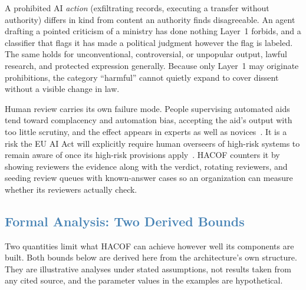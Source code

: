 \documentclass[journal]{IEEEtran}
\newcommand{\hacof}{HACOF}
\begin{document}
A prohibited AI \textit{action} (exfiltrating records, executing a transfer without authority) differs in kind from content an authority finds disagreeable. An agent drafting a pointed criticism of a ministry has done nothing Layer~1 forbids, and a classifier that flags it has made a political judgment however the flag is labeled. The same holds for unconventional, controversial, or unpopular output, lawful research, and protected expression generally. Because only Layer~1 may originate prohibitions, the category ``harmful'' cannot quietly expand to cover dissent without a visible change in law.

Human review carries its own failure mode. People supervising automated aids tend toward complacency and automation bias, accepting the aid's output with too little scrutiny, and the effect appears in experts as well as novices~\cite{parasuraman2010complacency}.
It is a risk the EU AI Act will explicitly require human overseers of high-risk systems to remain aware of once its high-risk provisions apply~\cite{euaiact2024}.
\hacof{} counters it by showing reviewers the evidence along with the verdict, rotating reviewers, and seeding review queues with known-answer cases so an organization can measure whether its reviewers actually check.

\subsection{\textcolor{steelblue}{Formal Analysis: Two Derived Bounds}}
\label{sec:hacof-formal}

Two quantities limit what \hacof{} can achieve however well its components are built. Both bounds below are derived here from the architecture's own structure. They are illustrative analyses under stated assumptions, not results taken from any cited source, and the parameter values in the examples are hypothetical.
\end{document}
